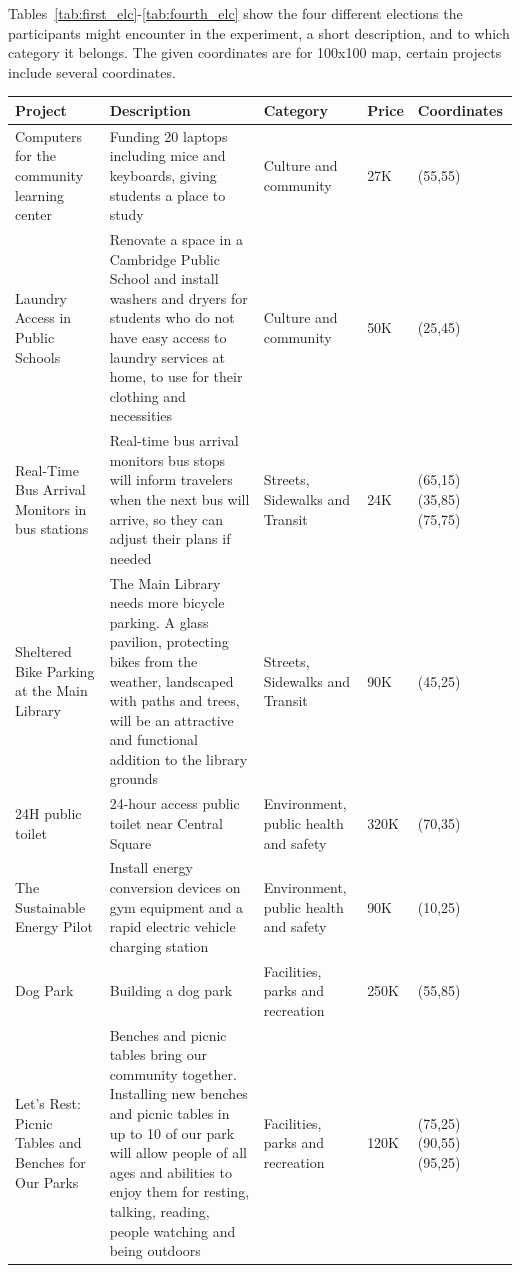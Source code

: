 \documentclass{comsoc2023}
\begin{document}
Tables~\ref{tab:first_elc}-\ref{tab:fourth_elc} show the four different elections the participants might encounter in the experiment, a short description, and to which category it belongs. The given coordinates are for 100x100 map, certain projects include several coordinates.


\begin{longtable}[ht!]{|p{2cm}|p{6cm}|p{3cm}|p{1cm}|p{2.5cm}|}
    \hline
    \textbf{Project} & \textbf{Description} & \textbf{Category} & \textbf{Price} & \textbf{Coordinates}\\
    \hline
    Computers for the community learning center & Funding 20 laptops including mice and keyboards, giving students a place to study & Culture and community &  27K & (55,55)\\
    \hline
    Laundry Access in Public Schools & Renovate a space in a Cambridge Public School and install washers and dryers for students who do not have easy access to laundry services at home, to use for their clothing and necessities & Culture and community & 50K & (25,45)\\
    \hline
    Real-Time Bus Arrival Monitors in bus stations & Real-time bus arrival monitors bus stops will inform travelers when the next bus will arrive, so they can adjust their plans if needed &  Streets, Sidewalks and Transit &  24K & (65,15) (35,85) (75,75)\\
    \hline
    Sheltered Bike Parking at the Main Library & The Main Library needs more bicycle parking. A glass pavilion, protecting bikes from the weather, landscaped with paths and trees, will be an attractive and functional addition to the library grounds & Streets, Sidewalks and Transit & 90K & (45,25)\\
    \hline
    24H public toilet & 24-hour access public toilet near Central Square & Environment, public health and safety & 320K & (70,35)\\
    \hline
    The Sustainable Energy Pilot & Install energy conversion devices on gym equipment and a rapid electric vehicle charging station & Environment, public health and safety & 90K & (10,25)\\
    \hline
    Dog Park & Building a dog park & Facilities, parks and recreation & 250K & (55,85)\\
    \hline
    Let’s Rest: Picnic Tables and Benches for Our Parks & Benches and picnic tables bring our community together. Installing new benches and picnic tables in up to 10 of our park will allow people of all ages and abilities to enjoy them for resting, talking, reading, people watching and being outdoors & Facilities, parks and recreation & 120K & (75,25) (90,55) (95,25)\\

\end{longtable}
\end{document}
